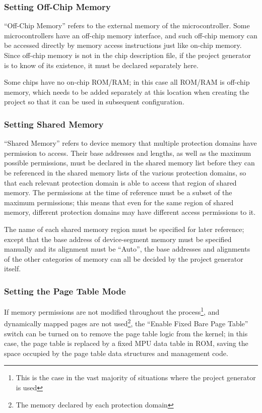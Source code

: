 \subsubsection{Setting Off-Chip Memory}\label{subsubsec:6-5-1-4}

``Off-Chip Memory'' refers to the external memory of the microcontroller. Some microcontrollers have an off-chip memory interface, and such off-chip memory can be accessed directly by memory access instructions just like on-chip memory. Since off-chip memory is not in the chip description file, if the project generator is to know of its existence, it must be declared separately here.

Some chips have no on-chip ROM/RAM; in this case all ROM/RAM is off-chip memory, which needs to be added separately at this location when creating the project so that it can be used in subsequent configuration.

\subsubsection{Setting Shared Memory}\label{subsubsec:6-5-1-5}

``Shared Memory'' refers to device memory that multiple protection domains have permission to access. Their base addresses and lengths, as well as the maximum possible permissions, must be declared in the shared memory list before they can be referenced in the shared memory lists of the various protection domains, so that each relevant protection domain is able to access that region of shared memory. The permissions at the time of reference must be a subset of the maximum permissions; this means that even for the same region of shared memory, different protection domains may have different access permissions to it.

The name of each shared memory region must be specified for later reference; except that the base address of device-segment memory must be specified manually and its alignment must be ``Auto'', the base addresses and alignments of the other categories of memory can all be decided by the project generator itself.

\subsubsection{Setting the Page Table Mode}\label{subsubsec:6-5-1-6}

If memory permissions are not modified throughout the process\footnote{This is the case in the vast majority of situations where the project generator is used}, and dynamically mapped pages are not used\footnote{The memory declared by each protection domain}, the ``Enable Fixed Bare Page Table'' switch can be turned on to remove the page table logic from the kernel; in this case, the page table is replaced by a fixed MPU data table in ROM, saving the space occupied by the page table data structures and management code.

